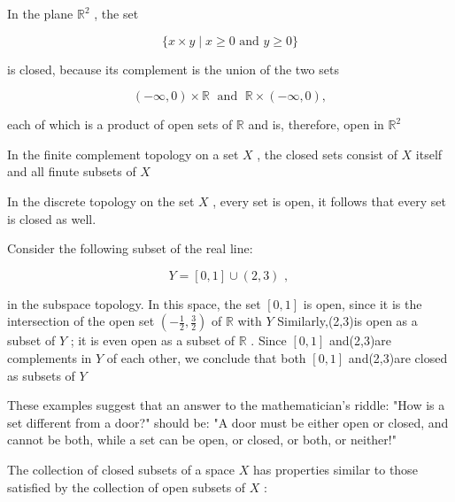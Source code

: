 \begin{example} In the plane \({\mathbb{R}}^{2}\) , the set

\[
\{ x \times  y \mid  x \geq  0\text{ and }y \geq  0\}
\]

is closed, because its complement is the union of the two sets

\[
\left( {-\infty ,0}\right)  \times  \mathbb{R}\;\text{ and }\;\mathbb{R} \times  \left( {-\infty ,0}\right) ,
\]

each of which is a product of open sets of \(\mathbb{R}\) and is, therefore, open in \({\mathbb{R}}^{2}\)
\end{example}

\begin{example} In the finite complement topology on a set \(X\) , the closed sets consist of \(X\) itself and all finute subsets of \(X\)
\end{example}

\begin{example} In the discrete topology on the set \(X\) , every set is open, it follows that every set is closed as well.
\end{example}

\begin{example} Consider the following subset of the real line:

\[
Y = \left\lbrack  {0,1}\right\rbrack   \cup  \left( {2,3}\right) \text{ , }
\]

in the subspace topology. In this space, the set \(\left\lbrack  {0,1}\right\rbrack\) is open, since it is the intersection of the open set \(\left( {-\frac{1}{2},\frac{3}{2}}\right)\) of \(\mathbb{R}\) with \(Y\) Similarly,(2,3)is open as a subset of \(Y\) ; it is even open as a subset of \(\mathbb{R}\) . Since \(\left\lbrack  {0,1}\right\rbrack\) and(2,3)are complements in \(Y\) of each other, we conclude that both \(\left\lbrack  {0,1}\right\rbrack\) and(2,3)are closed as subsets of \(Y\)
\end{example}

These examples suggest that an answer to the mathematician's riddle: "How is a set different from a door?" should be: "A door must be either open or closed, and cannot be both, while a set can be open, or closed, or both, or neither!"

The collection of closed subsets of a space \(X\) has properties similar to those satisfied by the collection of open subsets of \(X\) :

